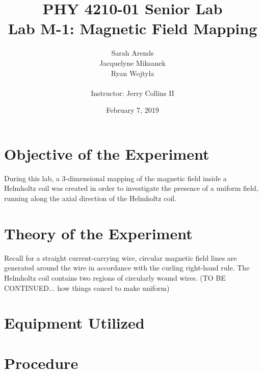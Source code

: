 \documentclass[a4paper]{article}
\title{PHY 4210-01 Senior Lab \\Lab M-1: Magnetic Field Mapping}
\author{Sarah Arends \\ 
        Jacquelyne Miksanek \\
        Ryan Wojtyla \\ \\
        Instructor: Jerry Collins II}
\date{February 7, 2019}
\begin{document}
\maketitle 

\begin{abstract}
\end{abstract}

\newpage

\tableofcontents

\newpage

\section{Objective of the Experiment}
During this lab, a 3-dimensional mapping of the magnetic field inside a Helmholtz coil was created in order to investigate the presence of a uniform field, running along the axial direction of the Helmholtz coil. 

\section{Theory of the Experiment}

Recall for a straight current-carrying wire, circular magnetic field lines are generated around the wire in accordance with the curling right-hand rule. The Helmholtz coil contains two regions of circularly wound wires. (TO BE CONTINUED... how things cancel to make uniform)

\section{Equipment Utilized}

\begin{figure}[h]
\centering
\label{diagram}
\end{figure}


\section{Procedure}
\end{document}

